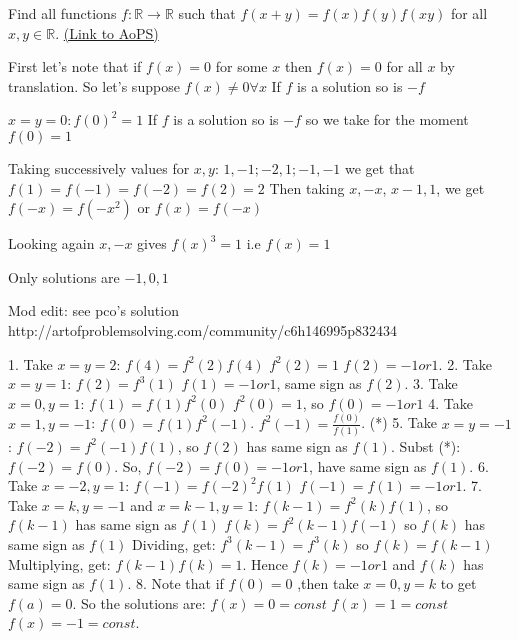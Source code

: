 \begin{problem}
	Find all functions $f : \mathbb{R} \to\mathbb{R}$ such that $f(x +y) = f(x) f(y) f(xy)$ for all $x, y \in \mathbb{R}.$
	\flushright \href{https://artofproblemsolving.com/community/c6h55433}{(Link to AoPS)}
\end{problem}



\begin{mysolution}
	First let's note that if $f(x) = 0$ for some $x$ then $f(x) = 0$ for all $x$ by translation.
So let's suppose $f(x) \neq 0 \forall x$
If $f$ is a solution  so is $-f$

$x=y=0 : f(0)^2 = 1$
If $f$ is a solution  so is $-f$ so we take for the moment $f(0) = 1$

Taking successively values for $x, y$: $1,-1;-2,1;-1,-1$ we get that $f(1) = f(-1) = f(-2) = f(2) = 2$
Then taking $x,-x$, $x-1,1$, we get $f(-x) = f(-x^2)$ or $f(x) = f(-x)$

Looking again $x,-x$ gives $f(x)^3= 1$ i.e $f(x) = 1$

Only solutions are $-1, 0, 1$

Mod edit: see pco's solution http://artofproblemsolving.com/community/c6h146995p832434
\end{mysolution}



\begin{mysolution}
	1. Take $x=y=2$:
$f(4)=f^2(2)f(4)$
$f^2(2)=1$
$f(2)=-1 or 1$.
2. Take $x=y=1$:
$f(2)=f^3(1)$
$f(1)=-1 or 1$, same sign as $f(2)$.
3. Take $x=0,y=1$:
$f(1)=f(1)f^2(0)$
$f^2(0)=1$, so $f(0)=-1 or 1$
4. Take $x=1,y=-1$:
$f(0)=f(1)f^2(-1)$.
$f^2(-1)=\frac{f(0)}{f(1)}$.  (*)
5. Take $x=y=-1$:
$f(-2)=f^2(-1)f(1)$, so $f(2)$ has same sign as $f(1)$.
Subst (*):
$f(-2)=f(0)$. So, $f(-2)=f(0)=-1 or 1$, have same sign as $f(1)$.
6. Take $x=-2,y=1$:
$f(-1)=f(-2)^2f(1)$
$f(-1)=f(1)=-1 or 1$.
7. Take $x=k,y=-1$ and $x=k-1,y=1$:
$f(k-1)=f^2(k)f(1)$, so $f(k-1)$ has same sign as $f(1)$
$f(k)=f^2(k-1)f(-1)$ so $f(k)$ has same sign as $f(1)$
Dividing, get: $f^3(k-1)=f^3(k)$ so $f(k)=f(k-1)$
Multiplying, get: $f(k-1)f(k)=1$. Hence $f(k)=-1 or 1$ and $f(k)$ has same sign as $f(1)$.
8. Note that if $f(0)=0$ ,then take $x=0,y=k$ to get $f(a)=0$.
So the solutions are:
$f(x)=0=const$
$f(x)=1=const$
$f(x)=-1=const$.
\end{mysolution}



